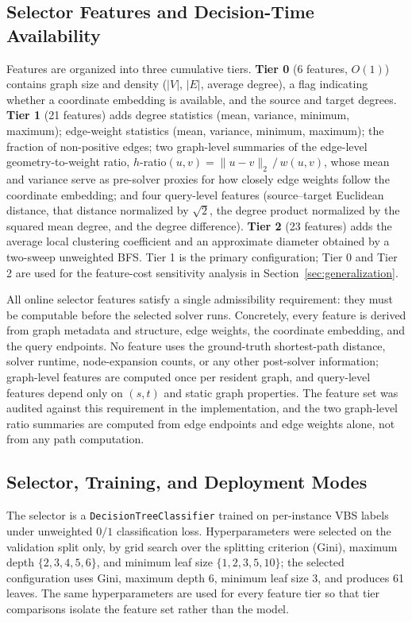 \documentclass[conference]{IEEEtran}
\begin{document}
\subsection{Selector Features and Decision-Time Availability}
\label{sec:features}
Features are organized into three cumulative tiers. \textbf{Tier 0} (6 features, $O(1)$) contains graph size and density ($|V|$, $|E|$, average degree), a flag indicating whether a coordinate embedding is available, and the source and target degrees. \textbf{Tier 1} (21 features) adds degree statistics (mean, variance, minimum, maximum); edge-weight statistics (mean, variance, minimum, maximum); the fraction of non-positive edges; two graph-level summaries of the edge-level geometry-to-weight ratio, $h$-ratio$(u,v)=\lVert u-v\rVert_2 \,/\, w(u,v)$, whose mean and variance serve as pre-solver proxies for how closely edge weights follow the coordinate embedding; and four query-level features (source--target Euclidean distance, that distance normalized by $\sqrt{2}$, the degree product normalized by the squared mean degree, and the degree difference). \textbf{Tier 2} (23 features) adds the average local clustering coefficient and an approximate diameter obtained by a two-sweep unweighted BFS. Tier 1 is the primary configuration; Tier 0 and Tier 2 are used for the feature-cost sensitivity analysis in Section~\ref{sec:generalization}.

All online selector features satisfy a single admissibility requirement: they must be computable before the selected solver runs. Concretely, every feature is derived from graph metadata and structure, edge weights, the coordinate embedding, and the query endpoints. No feature uses the ground-truth shortest-path distance, solver runtime, node-expansion counts, or any other post-solver information; graph-level features are computed once per resident graph, and query-level features depend only on $(s,t)$ and static graph properties. The feature set was audited against this requirement in the implementation, and the two graph-level ratio summaries are computed from edge endpoints and edge weights alone, not from any path computation.

\subsection{Selector, Training, and Deployment Modes}
The selector is a \texttt{DecisionTreeClassifier} trained on per-instance VBS labels under unweighted $0/1$ classification loss. Hyperparameters were selected on the validation split only, by grid search over the splitting criterion (Gini), maximum depth $\{2,3,4,5,6\}$, and minimum leaf size $\{1,2,3,5,10\}$; the selected configuration uses Gini, maximum depth 6, minimum leaf size 3, and produces 61 leaves. The same hyperparameters are used for every feature tier so that tier comparisons isolate the feature set rather than the model.
\end{document}
